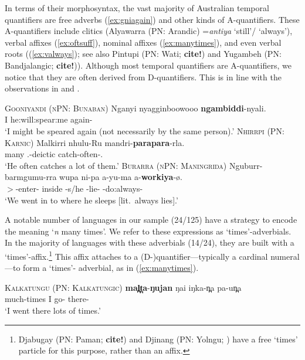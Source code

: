 \documentclass[12pt,egregdoesnotlikesansseriftitles]{scrartcl}
\begin{document}
In terms of their morphosyntax, the vast majority of Australian temporal quantifiers are free adverbs (\ref{ex:gniagain}) and other kinds of A-quantifiers. These A-quantifiers include clitics (Alyawarra (PN: Arandic) =\textit{antiya} `still'/ `always'), verbal affixes (\ref{ex:oftsuff}), %
nominal affixes (\ref{ex:manytimes}), and even verbal roots ((\ref{ex:valways}); see also Pintupi (PN: Wati; \textbf{cite!}) and Yugambeh (PN: Bandjalangic; \textbf{cite!})). Although most temporal quantifiers are A-quantifiers, we notice that they are often derived from D-quantifiers. This is in line with the observations in \citet{gil93} and \citet{keenanpaperno17ov}.
\begin{exe}
  \ex\label{ex:gniagain} \textsc{Gooniyandi (nPN: Bunaban)}\hfill {}
  \gll Nganyi nyagginboowooo \textbf{ngambiddi}-nyali.\\
  I he:will:spear:me again-\Rep\\
  \glt `I might be speared again (not necessarily by the same person).'
  \ex\label{ex:oftsuff} \textsc{Nhirrpi (PN: Karnic)}\hfill {}
  \gll Malkirri nhulu-Ru mandri-\textbf{parapara}-rla.\\
  many \Tsg.\Erg-deictic catch-often-\Prs.\Prog\\
  `He often catches a lot of them.'
  \ex\label{ex:valways} \textsc{Burarra (nPN: Maningrida)}\hfill {}
  \gll Nguburr-barmgumu-rra wupa ni-pa a-yu-ma a-\textbf{workiya}-ø.\\
  \First$>$\Second\Aug-enter-\Pc{} inside \Third\Min-s/he  \Third\Min-lie-\Ctp{} \Third\Min-do:always-\Ctp\\
  \glt `We went in to where he sleeps [lit.\ always lies].'
\end{exe}

A notable number of languages in our sample (24/125) have a strategy to encode the meaning `\textit{n} many times'. We refer to these expressions as `times'-adverbials. In the majority of languages with these adverbials (14/24), they are built with a `times'-affix.\footnote{Djabugay (PN: Paman; \textbf{cite!}) and Djinang (PN: Yolngu; \citealt{waters83}) have a free `times' particle for this purpose, rather than an affix.} This affix attaches to a (D-)quantifier---typically a cardinal numeral---to form a `times'- adverbial, as in (\ref{ex:manytimes}). 
\begin{exe}
  \ex\label{ex:manytimes} \textsc{Kalkatungu (PN: Kalkatungic)}\hfill {}
  \gll \textbf{mal̪t̪a}-\textbf{ŋujan} ŋai iŋka-n̪a pa-un̪a\\
  much-times I go-\Pst{} there-\All\\
  \glt `I went there lots of times.'
  \end{exe}
  
\end{document}
